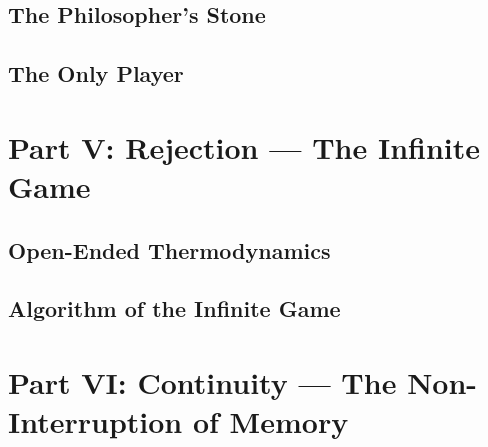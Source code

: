 \documentclass[11pt,a4paper,twoside]{book}
\begin{document}
\chapter{The Philosopher's Stone}




\chapter{The Only Player}




\part{Part V: Rejection --- The Infinite Game}


\chapter{Open-Ended Thermodynamics}




\chapter{Algorithm of the Infinite Game}




\part{Part VI: Continuity --- The Non-Interruption of Memory}

\end{document}
